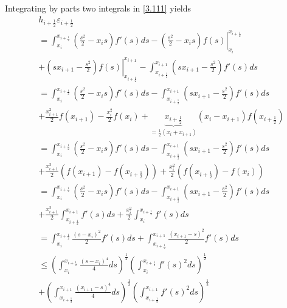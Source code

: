 \documentclass[a4paper]{article}
\numberwithin{equation}{section}
\begin{document}
Integrating by parts two integrals in \eqref{3.111} yields
\begin{align}
&{h_{i + \frac{1}{2}}}{\varepsilon _{i + \frac{1}{2}}}\\
 &= \int_{{x_i}}^{{x_{i + \frac{1}{2}}}} {\left( {\frac{{{s^2}}}{2} - {x_i}s} \right)f'\left( s \right)ds}  - \left. {\left( {\frac{{{s^2}}}{2} - {x_i}s} \right)f\left( s \right)} \right|_{{x_i}}^{{x_{i + \frac{1}{2}}}}\\
& + \left. {\left( {s{x_{i + 1}} - \frac{{{s^2}}}{2}} \right)f\left( s \right)} \right|_{{x_{i + \frac{1}{2}}}}^{{x_{i + 1}}} - \int_{{x_{i + \frac{1}{2}}}}^{{x_{i + 1}}} {\left( {s{x_{i + 1}} - \frac{{{s^2}}}{2}} \right)f'\left( s \right)ds} \\
& = \int_{{x_i}}^{{x_{i + \frac{1}{2}}}} {\left( {\frac{{{s^2}}}{2} - {x_i}s} \right)f'\left( s \right)ds}  - \int_{{x_{i + \frac{1}{2}}}}^{{x_{i + 1}}} {\left( {s{x_{i + 1}} - \frac{{{s^2}}}{2}} \right)f'\left( s \right)ds} \\
& + \frac{{x_{i + 1}^2}}{2}f\left( {{x_{i + 1}}} \right) - \frac{{x_i^2}}{2}f\left( {{x_i}} \right) + \underbrace {{x_{i + \frac{1}{2}}}}_{ = \frac{1}{2}\left( {{x_i} + {x_{i + 1}}} \right)}\left( {{x_i} - {x_{i + 1}}} \right)f\left( {{x_{i + \frac{1}{2}}}} \right)\\
& = \int_{{x_i}}^{{x_{i + \frac{1}{2}}}} {\left( {\frac{{{s^2}}}{2} - {x_i}s} \right)f'\left( s \right)ds}  - \int_{{x_{i + \frac{1}{2}}}}^{{x_{i + 1}}} {\left( {s{x_{i + 1}} - \frac{{{s^2}}}{2}} \right)f'\left( s \right)ds} \\
& + \frac{{x_{i + 1}^2}}{2}\left( {f\left( {{x_{i + 1}}} \right) - f\left( {{x_{i + \frac{1}{2}}}} \right)} \right) + \frac{{x_i^2}}{2}\left( {f\left( {{x_{i + \frac{1}{2}}}} \right) - f\left( {{x_i}} \right)} \right)\\
 &= \int_{{x_i}}^{{x_{i + \frac{1}{2}}}} {\left( {\frac{{{s^2}}}{2} - {x_i}s} \right)f'\left( s \right)ds}  - \int_{{x_{i + \frac{1}{2}}}}^{{x_{i + 1}}} {\left( {s{x_{i + 1}} - \frac{{{s^2}}}{2}} \right)f'\left( s \right)ds} \\
& + \frac{{x_{i + 1}^2}}{2}\int_{{x_{i + \frac{1}{2}}}}^{{x_{i + 1}}} {f'\left( s \right)ds}  + \frac{{x_i^2}}{2}\int_{{x_i}}^{{x_{i + \frac{1}{2}}}} {f'\left( s \right)ds} \\
& = \int_{{x_i}}^{{x_{i + \frac{1}{2}}}} {\frac{{{{\left( {s - {x_i}} \right)}^2}}}{2}f'\left( s \right)ds}  + \int_{{x_{i + \frac{1}{2}}}}^{{x_{i + 1}}} {\frac{{{{\left( {{x_{i + 1}} - s} \right)}^2}}}{2}f'\left( s \right)ds} \\
& \le {\left( {\int_{{x_i}}^{{x_{i + \frac{1}{2}}}} {\frac{{{{\left( {s - {x_i}} \right)}^4}}}{4}ds} } \right)^{\frac{1}{2}}}{\left( {\int_{{x_i}}^{{x_{i + \frac{1}{2}}}} {f'{{\left( s \right)}^2}ds} } \right)^{\frac{1}{2}}}\\
& + {\left( {\int_{{x_{i + \frac{1}{2}}}}^{{x_{i + 1}}} {\frac{{{{\left( {{x_{i + 1}} - s} \right)}^4}}}{4}ds} } \right)^{\frac{1}{2}}}{\left( {\int_{{x_{i + \frac{1}{2}}}}^{{x_{i + 1}}} {f'{{\left( s \right)}^2}ds} } \right)^{\frac{1}{2}}}
\end{align}
\end{document}
